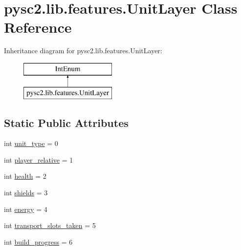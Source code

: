 \hypertarget{classpysc2_1_1lib_1_1features_1_1_unit_layer}{}\section{pysc2.\+lib.\+features.\+Unit\+Layer Class Reference}
\label{classpysc2_1_1lib_1_1features_1_1_unit_layer}
Inheritance diagram for pysc2.\+lib.\+features.\+Unit\+Layer\+:\begin{figure}[H]
\begin{center}
\leavevmode
\includegraphics[height=2.000000cm]{classpysc2_1_1lib_1_1features_1_1_unit_layer}
\end{center}
\end{figure}
\subsection*{Static Public Attributes}
\begin{DoxyCompactItemize}
\item 
int \mbox{\hyperlink{classpysc2_1_1lib_1_1features_1_1_unit_layer_a52b3f860e08bacbf1bd6d7e443c4f772}{unit\+\_\+type}} = 0
\item 
int \mbox{\hyperlink{classpysc2_1_1lib_1_1features_1_1_unit_layer_ad39fb9a2fbb7bd5e3d707de23cb86c0a}{player\+\_\+relative}} = 1
\item 
int \mbox{\hyperlink{classpysc2_1_1lib_1_1features_1_1_unit_layer_ae68de1e2aff64764c068a7ae10d99fc2}{health}} = 2
\item 
int \mbox{\hyperlink{classpysc2_1_1lib_1_1features_1_1_unit_layer_a4f84f5490e0f9a8e73e2a8c779522515}{shields}} = 3
\item 
int \mbox{\hyperlink{classpysc2_1_1lib_1_1features_1_1_unit_layer_abb1ad705cfb611ac551b3846fcd15654}{energy}} = 4
\item 
int \mbox{\hyperlink{classpysc2_1_1lib_1_1features_1_1_unit_layer_a83607cd46afd44f3f8b0a7758bbcbf07}{transport\+\_\+slots\+\_\+taken}} = 5
\item 
int \mbox{\hyperlink{classpysc2_1_1lib_1_1features_1_1_unit_layer_a8778f6bfa2054ac0378c45261effe60c}{build\+\_\+progress}} = 6
\end{DoxyCompactItemize}


